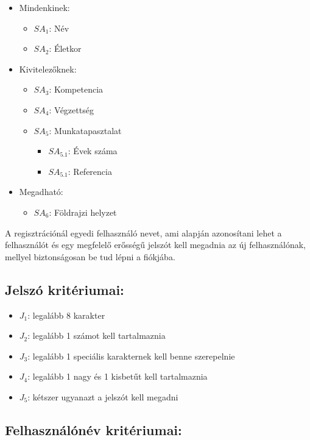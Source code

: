 \begin{itemize}
    \item Mindenkinek:
    \begin{itemize}
        \item $SA_1$: Név
        \item $SA_2$: Életkor
    \end{itemize}
    \item Kivitelezőknek:
    \begin{itemize}
        \item $SA_3$: Kompetencia
        \item $SA_4$: Végzettség
        \item $SA_5$: Munkatapasztalat
        \begin{itemize}
            \item $SA_{5.1}$: Évek száma
            \item $SA_{5.1}$: Referencia
        \end{itemize}
    \end{itemize}
    
    \item Megadható:
    \begin{itemize}
        \item $SA_6$: Földrajzi helyzet
    \end{itemize}
\end{itemize}

A regisztrációnál egyedi felhasználó nevet, ami alapján azonosítani lehet a felhasználót és egy megfelelő erősségű jelszót kell megadnia az új felhasználónak, mellyel biztonságosan be tud lépni a fiókjába.

\subsection{Jelszó kritériumai:}

\begin{itemize}
    \item $J_1$: legalább 8 karakter
    \item $J_2$: legalább 1 számot kell tartalmaznia
    \item $J_3$: legalább 1 speciális karakternek kell benne szerepelnie
    \item $J_4$: legalább 1 nagy és 1 kisbetűt kell tartalmaznia
    \item $J_5$: kétszer ugyanazt a jelszót kell megadni
\end{itemize}

\subsection{Felhasználónév kritériumai:}

